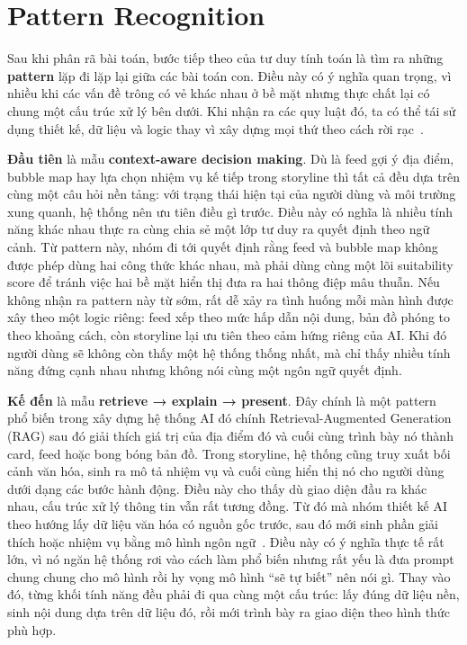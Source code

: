 \section{Pattern Recognition}

Sau khi phân rã bài toán, bước tiếp theo của tư duy tính toán là tìm ra
những \textbf{pattern} lặp đi lặp lại giữa các bài toán con. Điều này có
ý nghĩa quan trọng, vì nhiều khi các vấn đề trông có vẻ khác nhau ở
bề mặt nhưng thực chất lại có chung một cấu trúc xử lý bên dưới. Khi
nhận ra các quy luật đó, ta có thể tái sử dụng thiết kế, dữ liệu và
logic thay vì xây dựng mọi thứ theo cách rời rạc~\cite{spronck2023, dejesus2020}.

\textbf{Đầu tiên} là mẫu \textbf{context-aware decision making}. Dù là
feed gợi ý địa điểm, bubble map hay lựa chọn nhiệm vụ kế tiếp trong
storyline thì tất cả đều dựa trên cùng một câu hỏi nền tảng: với trạng
thái hiện tại của người dùng và môi trường xung quanh, hệ thống nên ưu
tiên điều gì trước. Điều này có nghĩa là nhiều tính năng khác nhau thực
ra cùng chia sẻ một lớp tư duy ra quyết định theo ngữ cảnh. Từ pattern
này, nhóm đi tới quyết định rằng feed và bubble map không được phép dùng
hai công thức khác nhau, mà phải dùng cùng một lõi suitability score để
tránh việc hai bề mặt hiển thị đưa ra hai thông điệp mâu thuẫn. Nếu
không nhận ra pattern này từ sớm, rất dễ xảy ra tình huống mỗi màn hình
được xây theo một logic riêng: feed xếp theo mức hấp dẫn nội dung, bản
đồ phóng to theo khoảng cách, còn storyline lại ưu tiên theo cảm hứng
riêng của AI. Khi đó người dùng sẽ không còn thấy một hệ thống thống
nhất, mà chỉ thấy nhiều tính năng đứng cạnh nhau nhưng không nói cùng
một ngôn ngữ quyết định.

\textbf{Kế đến} là mẫu \textbf{retrieve → explain → present}. Đây chính là một pattern
phổ biến trong xây dựng hệ thống AI đó chính Retrieval-Augmented Generation (RAG) sau đó giải
thích giá trị của địa điểm đó và cuối cùng trình bày nó thành card, feed
hoặc bong bóng bản đồ. Trong storyline, hệ thống cũng truy xuất bối cảnh
văn hóa, sinh ra mô tả nhiệm vụ và cuối cùng hiển thị nó cho người dùng
dưới dạng các bước hành động. Điều này cho thấy dù giao diện đầu ra khác
nhau, cấu trúc xử lý thông tin vẫn rất tương đồng. Từ đó mà nhóm thiết
kế AI theo hướng lấy dữ liệu văn hóa có nguồn gốc trước, sau đó mới sinh
phần giải thích hoặc nhiệm vụ bằng mô hình ngôn ngữ~\cite{bevietnam_spec}.
Điều này có ý nghĩa thực tế rất lớn, vì nó ngăn hệ thống rơi vào cách
làm phổ biến nhưng rất yếu là đưa prompt chung chung cho mô hình rồi hy
vọng mô hình ``sẽ tự biết'' nên nói gì. Thay vào đó, từng khối tính năng
đều phải đi qua cùng một cấu trúc: lấy đúng dữ liệu nền, sinh nội dung
dựa trên dữ liệu đó, rồi mới trình bày ra giao diện theo hình thức phù
hợp.


